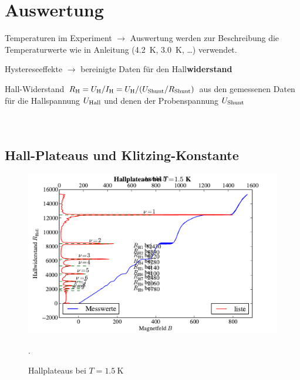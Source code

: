 \documentclass[paper=a4,fontsize=10pt,DIV=18,twocolumn,parskip=half]{scrartcl}
\numberwithin{equation}{section}    %
\begin{document}
%
\section{Auswertung}
\label{Auswertung}
%


\begin{compactitem}
	\item Temperaturen im Experiment $\rightarrow$ Auswertung werden zur Beschreibung die Temperaturwerte wie in Anleitung (\SI{4.2}{\kelvin}, \SI{3.0}{\kelvin}, \dots) verwendet.
	\item Hystereseeffekte $\rightarrow$ bereinigte Daten für den Hall\textbf{widerstand}
\end{compactitem}

Hall-Widerstand $R_{\rm H}=U_{\rm H}/I_{\rm H} = U_{\rm H}/(U_{\rm Shunt}/R_{\rm Shunt})$ aus den gemessenen Daten für die Hallspannung $U_{\rm Hall}$ und denen der Probenspannung $U_{\rm Shunt}$
% 
~~~~~~~~~~~~~~~~~~~~~~~~~~~~~~~~~~~~~~~~~~~~~~~~~~~~~~~~~~~~~~~~~~~~~~~~~~~~~
\subsection{Hall-Plateaus und Klitzing-Konstante}
\label{a1}

\begin{figure}[htp]
	\begin{center}
		\includegraphics[width=\columnwidth]{Data-Plots/05-1,5-Hallplateaus.pdf}
		\caption{Hallplateaus bei $T=\SI{1.5}{\kelvin}$}.
		\label{hallplateau}
	\end{center}
\end{figure}
\end{document}
